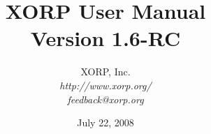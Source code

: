 \documentclass[11pt]{book}
\begin{document}
\title{{\Huge XORP User Manual}\\
\vspace{1ex}
Version 1.6-RC}
\author{ XORP, Inc.					\\
         {\it http://www.xorp.org/}			\\
	 {\it feedback@xorp.org}
}
\date{July 22, 2008}

\maketitle


%
%
\newcommand{\xorp}{{\small XORP}\xspace}
\newcommand{\xorpsh}{{\sf\small xorpsh}\xspace}
\newcommand{\rtrmgr}{{\sf\small xorp\_rtrmgr}\xspace}
\newcommand{\stt}{\tt\small}
\newcommand{\ssf}{\sf\small}



\tableofcontents

























\end{document}
